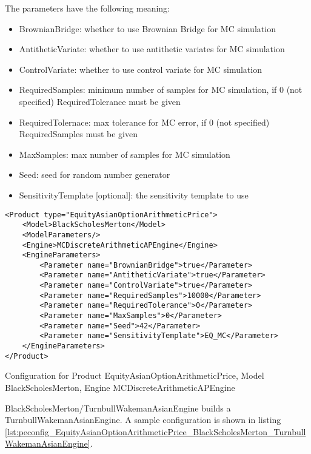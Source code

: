The parameters have the following meaning:

\begin{itemize}
\item BrownianBridge: whether to use Brownian Bridge for MC simulation
\item AntitheticVariate: whether to use antithetic variates for MC simulation
\item ControlVariate: whether to use control variate for MC simulation
\item RequiredSamples: minimum number of samples for MC simulation, if 0 (not specified) RequiredTolerance must be given
\item RequiredTolernace: max tolerance for MC error, if 0 (not specified) RequiredSamples must be given
\item MaxSamples: max number of samples for MC simulation
\item Seed: seed for random number generator
\item SensitivityTemplate [optional]: the sensitivity template to use 
\end{itemize}

\begin{longlisting}
\begin{verbatim}
<Product type="EquityAsianOptionArithmeticPrice">
    <Model>BlackScholesMerton</Model>
    <ModelParameters/>
    <Engine>MCDiscreteArithmeticAPEngine</Engine>
    <EngineParameters>
        <Parameter name="BrownianBridge">true</Parameter>    
        <Parameter name="AntitheticVariate">true</Parameter>    
        <Parameter name="ControlVariate">true</Parameter>    
        <Parameter name="RequiredSamples">10000</Parameter>    
        <Parameter name="RequiredTolerance">0</Parameter>    
        <Parameter name="MaxSamples">0</Parameter>    
        <Parameter name="Seed">42</Parameter>    
        <Parameter name="SensitivityTemplate">EQ_MC</Parameter>
    </EngineParameters>
</Product>
\end{verbatim}
\caption{Configuration for Product EquityAsianOptionArithmeticPrice, Model BlackScholesMerton, Engine MCDiscreteArithmeticAPEngine}
\label{lst:peconfig_EquityAsianOptionArithmeticPrice_BlackScholesMerton_MCDiscreteArithmeticAPEngine}
\end{longlisting}

BlackScholesMerton/TurnbullWakemanAsianEngine builds a TurnbullWakemanAsianEngine. A sample configuration is shown in
listing \ref{lst:peconfig_EquityAsianOptionArithmeticPrice_BlackScholesMerton_TurnbullWakemanAsianEngine}.

